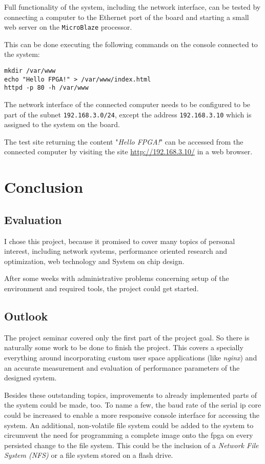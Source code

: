Full functionality of the system, including the network interface, can be tested by connecting a computer to the Ethernet port of the board and starting a small web server on the \texttt{MicroBlaze} processor.

This can be done executing the following commands on the console connected to the system:

\begin{verbatim}
mkdir /var/www
echo "Hello FPGA!" > /var/www/index.html
httpd -p 80 -h /var/www
\end{verbatim}

The network interface of the connected computer needs to be configured to be part of the subnet \texttt{192.168.3.0/24}, except the address \texttt{192.168.3.10} which is assigned to the system on the board.

The test site returning the content "\textit{Hello FPGA!}" can be accessed from the connected computer by visiting the site \url{http://192.168.3.10/} in a web browser.

\chapter{Conclusion}

\section{Evaluation}

I chose this project, because it promised to cover many topics of personal interest, including network systems, performance oriented research and optimization, web technology and System on chip design.

After some weeks with administrative problems concerning setup of the environment and required tools, the project could get started. 

\section{Outlook}

The project seminar covered only the first part of the project goal. So there is naturally some work to be done to finish the project. This covers a specially everything around incorporating custom user space applications (like \textit{nginx}) and an accurate measurement and evaluation of performance parameters of the designed system.

Besides these outstanding topics, improvements to already implemented parts of the system could be made, too. To name a few, the baud rate of the serial \gls{ip} core could be increased to enable a more responsive console interface for accessing the system. An additional, non-volatile file system could be added to the system to circumvent the need for programming a complete image onto the \gls{fpga} on every persisted change to the file system. This could be the inclusion of a \textit{Network File System (NFS)} or a file system stored on a flash drive.


